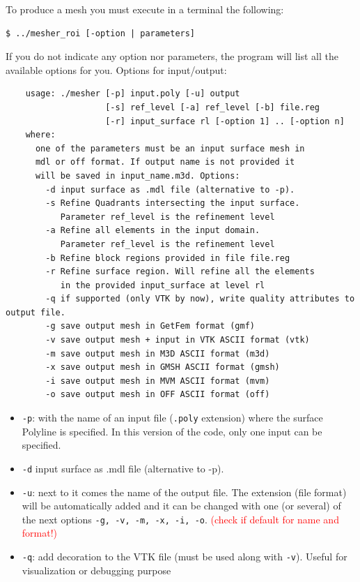\documentclass[10pt]{article}
\begin{document}
To produce a mesh you must execute in a terminal the following:
%
{\small
\begin{verbatim}
$ ../mesher_roi [-option | parameters]
\end{verbatim}
}
If you do not indicate any option nor parameters, the program will list all the available options for you. Options for input/output:
{\small
\begin{verbatim}
    usage: ./mesher [-p] input.poly [-u] output
                    [-s] ref_level [-a] ref_level [-b] file.reg
                    [-r] input_surface rl [-option 1] .. [-option n]
    where:
      one of the parameters must be an input surface mesh in
      mdl or off format. If output name is not provided it
      will be saved in input_name.m3d. Options:
        -d input surface as .mdl file (alternative to -p).
        -s Refine Quadrants intersecting the input surface.
           Parameter ref_level is the refinement level
        -a Refine all elements in the input domain.
           Parameter ref_level is the refinement level
        -b Refine block regions provided in file file.reg
        -r Refine surface region. Will refine all the elements
           in the provided input_surface at level rl
        -q if supported (only VTK by now), write quality attributes to output file.
        -g save output mesh in GetFem format (gmf)
        -v save output mesh + input in VTK ASCII format (vtk)
        -m save output mesh in M3D ASCII format (m3d)
        -x save output mesh in GMSH ASCII format (gmsh)
        -i save output mesh in MVM ASCII format (mvm)
        -o save output mesh in OFF ASCII format (off)
\end{verbatim}
}

\begin{itemize}
\item \texttt{-p}: with the name of an input file (\texttt{.poly} extension) where the surface Polyline is specified. In this version of the code, only one input can be specified.
\item  \texttt{-d} input surface as .mdl file (alternative to -p).
\item \texttt{-u}: next to it comes the name of the output file. The extension (file format) will be automatically added and  it can be changed with one (or several) of  the next options \texttt{-g, -v, -m, -x, -i, -o}. \textcolor{red}{(check if default for  name and format!)}
\item \texttt{-q}: add decoration to the VTK file (must be used along with \texttt{-v}). Useful for visualization or debugging purpose
\end{itemize}
\end{document}
